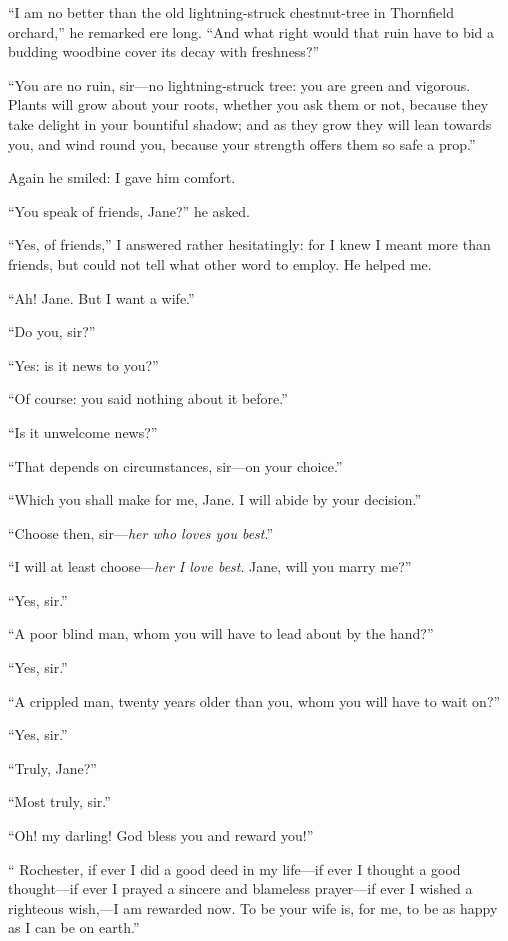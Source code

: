 \enquote{I am no better than the old lightning-struck chestnut-tree in
	Thornfield orchard,} he remarked ere long. \enquote{And what right
	would that ruin have to bid a budding woodbine cover its decay with
	freshness?}

\enquote{You are no ruin, sir---no lightning-struck tree: you are green
	and vigorous. Plants will grow about your roots, whether you ask them
	or not, because they take delight in your bountiful shadow; and as they
	grow they will lean towards you, and wind round you, because your
	strength offers them so safe a prop.}

Again he smiled: I gave him comfort.

\enquote{You speak of friends, Jane?} he asked.

\enquote{Yes, of friends,} I answered rather hesitatingly: for I knew I
meant more than friends, but could not tell what other word to employ.
He helped me.

\enquote{Ah! Jane. But I want a wife.}

\enquote{Do you, sir?}

\enquote{Yes: is it news to you?}

\enquote{Of course: you said nothing about it before.}

\enquote{Is it unwelcome news?}

\enquote{That depends on circumstances, sir---on your choice.}

\enquote{Which you shall make for me, Jane. I will abide by your
	decision.}

\enquote{Choose then, sir---\emph{her who loves you best}.}

\enquote{I will at least choose---\emph{her I love best}. Jane, will you marry
	me?}

\enquote{Yes, sir.}

\enquote{A poor blind man, whom you will have to lead about by the
	hand?}

\enquote{Yes, sir.}

\enquote{A crippled man, twenty years older than you, whom you will have
	to wait on?}

\enquote{Yes, sir.}

\enquote{Truly, Jane?}

\enquote{Most truly, sir.}

\enquote{Oh! my darling! God bless you and reward you!}

\enquote{\Mr{} Rochester, if ever I did a good deed in my life---if ever I
	thought a good thought---if ever I prayed a sincere and blameless
	prayer---if ever I wished a righteous wish,---I am rewarded now. To be
	your wife is, for me, to be as happy as I can be on earth.}


